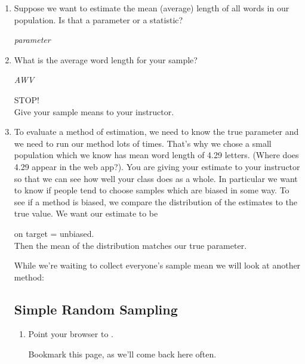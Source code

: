 \begin{enumerate}
\item Suppose we want to estimate the mean (average) length of all
  words in our population. Is that a parameter or a statistic?
\begin{students}
  \vspace{1cm}
\end{students}    
\begin{key}
   {\it parameter}
\end{key}
\item What is the average word length for your sample?
\begin{students}
  \vspace{1cm}
\end{students}    
\begin{key}
   {\it AWV}
\end{key}

  \begin{center}
    {\LARGE STOP!}\\
Give your sample means to your instructor.
  \end{center}

\item To evaluate a method of estimation, we need to know the true
  parameter and we need to run our method lots of times.  That's why
  we chose a small population which we know has mean word length of
  4.29 letters. (Where does 4.29 appear in the web app?).  You are
  giving your estimate to your instructor so that we can see how well
  your class does as a whole.  In particular we want to know if people
  tend to choose samples which are biased in some way. To see if a
  method is biased, we compare the distribution of the estimates to
  the true value.  We want our estimate to be
  \begin{center}
    {\large on target = unbiased.}\\
  Then the mean of the distribution matches our true parameter.
  \end{center}
  While we're waiting to collect everyone's sample mean we will look
  at another method:
 
    \subsection{ Simple Random Sampling}
 
  \begin{enumerate}
    \item Point your browser to \webAppURLFrst.

 Bookmark this page, as we'll come back here often.  


\end{enumerate}
\end{enumerate}
